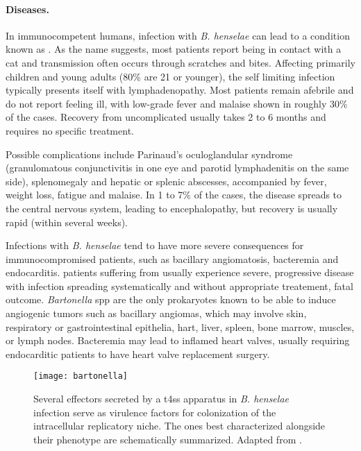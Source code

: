 \paragraph{Diseases.}
In immunocompetent humans, infection with \textit{B. henselae} can lead to a condition known as . As the name suggests, most patients report being in contact with a cat and transmission often occurs through scratches and bites. Affecting primarily children and young adults (80\% are 21 or younger), the self limiting infection typically presents itself with lymphadenopathy. Most patients remain afebrile and do not report feeling ill, with low-grade fever and malaise shown in roughly 30\% of the cases. Recovery from uncomplicated  usually takes 2 to 6 months and requires no specific treatment.

Possible complications include Parinaud's oculoglandular syndrome (granulomatous conjunctivitis in one eye and parotid lymphadenitis on the same side), splenomegaly and hepatic or splenic abscesses, accompanied by fever, weight loss, fatigue and malaise. In 1 to 7\% of the cases, the disease spreads to the central nervous system, leading to encephalopathy, but recovery is usually rapid (within several weeks).

Infections with \textit{B. henselae} tend to have more severe consequences for immunocompromised patients, such as bacillary angiomatosis, bacteremia and endocarditis.  patients suffering from  usually experience severe, progressive disease with infection spreading systematically and without appropriate treatement, fatal outcome. \textit{Bartonella} \acrshort{spp} are the only prokaryotes known to be able to induce angiogenic tumors such as bacillary angiomas, which may involve skin, respiratory or gastrointestinal epithelia, hart, liver, spleen, bone marrow, muscles, or lymph nodes. Bacteremia may lead to inflamed heart valves, usually requiring endocarditic patients to have heart valve replacement surgery.

\begin{figure}
  \centering
  \texttt{[image: bartonella]}
  \caption[Bacterial effectors of \textit{B. henselae}, secreted by a  into the host cytosol.]{Several effectors secreted by a \acrshort{t4ss} apparatus in \textit{B. henselae} infection serve as virulence factors for colonization of the intracellular replicatory niche. The ones best characterized alongside their phenotype are schematically summarized. Adapted from \citet{Harms2012}.}
  \label{fig:bartonella}
\end{figure}

